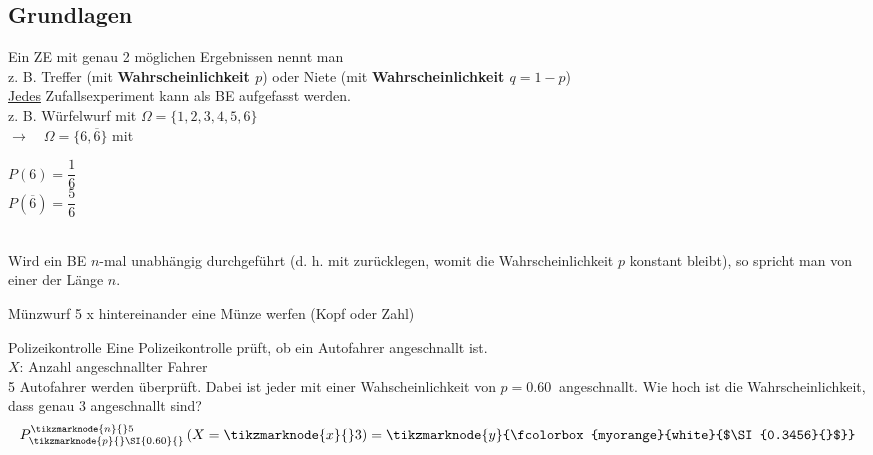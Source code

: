 
\subsection{Grundlagen}

\begin{note}
    Ein ZE mit genau 2 möglichen Ergebnissen nennt man \\[1.0ex]
    z. B. Treffer (mit \textbf{Wahrscheinlichkeit $p$}) oder Niete (mit \textbf{Wahrscheinlichkeit $q = 1 - p$})\\[2.0ex]
    \underline{Jedes} Zufallsexperiment kann als BE aufgefasst werden. \\[1.0ex]
    z. B. Würfelwurf mit $\Omega = \{1, 2, 3, 4, 5, 6\}$\\[1.0ex]
    $\rightarrow \quad \Omega = \{ 6, \overline{6}\}$ \quad mit \quad \begin{minipage}[t]{\linewidth}
        $P(6) = \dfrac{1}{6}$\\[1.5ex]
        $P(\overline{6}) = \dfrac{5}{6}$
    \end{minipage}\\[2.0ex]
    Wird ein BE $n$-mal unabhängig durchgeführt (d. h. mit zurücklegen, womit die Wahrscheinlichkeit $p$ konstant bleibt), so spricht man von einer  der Länge $n$.
    \begin{Example}{Münzwurf}{}
        5 x hintereinander eine Münze werfen (Kopf oder Zahl)
    \end{Example}
    \begin{Example}{Polizeikontrolle}{}
        Eine Polizeikontrolle prüft, ob ein Autofahrer angeschnallt ist.\\[1.0ex]
        $X$: Anzahl angeschnallter Fahrer\\[1.0ex]
        5 Autofahrer werden überprüft. Dabei ist jeder mit einer Wahscheinlichkeit von $p = \SI{0.60}{}$ angeschnallt. Wie hoch ist die Wahrscheinlichkeit, dass genau 3 angeschnallt sind?\\[3.0ex]
        \begin{equation*}
            P_{\tikzmarknode{p}{}\SI{0.60}{}}^{\tikzmarknode{n}{}5} \left(X = \tikzmarknode{x}{}3\right) = \tikzmarknode{y}{\fcolorbox{myorange}{white}{$\SI{0.3456}{}$}}
        \end{equation*}\\[5.0ex]
\end{Example}
\end{note}
